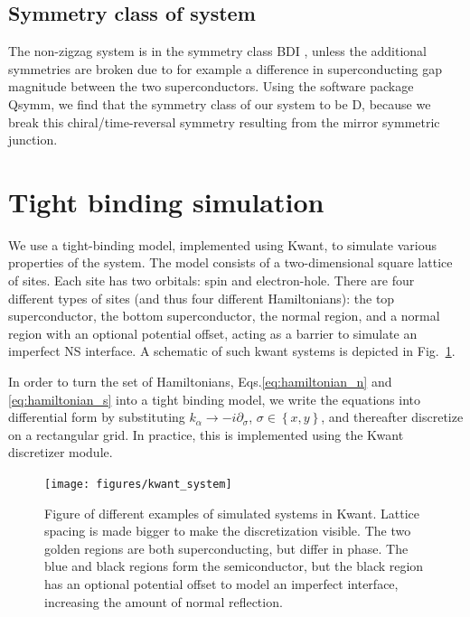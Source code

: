 \subsection{Symmetry class of system}
	The non-zigzag system is in the symmetry class BDI \cite{pientka_topological_2017}, unless the additional symmetries are broken due to for example a difference in superconducting gap magnitude between the two superconductors.
	Using the software package Qsymm\cite{varjas_qsymm_2018}, we find that the symmetry class of our system to be D, because we break this chiral/time-reversal symmetry resulting from the mirror symmetric junction.


\section{Tight binding simulation}

	We use a tight-binding model, implemented using Kwant, to simulate various properties of the system.
	The model consists of a two-dimensional square lattice of sites.
	Each site has two orbitals: spin and electron-hole.
	There are four different types of sites (and thus four different Hamiltonians): the top superconductor, the bottom superconductor, the normal region, and a normal region with an optional potential offset, acting as a barrier to simulate an imperfect NS interface.
	A schematic of such kwant systems is depicted in Fig.~\ref{fig:kwant_system}.

	In order to turn the set of Hamiltonians, Eqs.\eqref{eq:hamiltonian_n} and \eqref{eq:hamiltonian_s} into a tight binding model, we write the equations into differential form by substituting $k_\alpha \rightarrow - i \partial_\sigma$, $\sigma \in \left\{ x, y \right\}$, and thereafter discretize on a rectangular grid.
	In practice, this is implemented using the Kwant discretizer module.


	\begin{figure}[!htb]
	\centering
	\texttt{[image: figures/kwant\_system]}
	\caption{Figure of different examples of simulated systems in Kwant.
	Lattice spacing is made bigger to make the discretization visible.
	The two golden regions are both superconducting, but differ in phase.
	The blue and black regions form the semiconductor, but the black region has an optional potential offset to model an imperfect interface, increasing the amount of normal reflection.}
	\label{fig:kwant_system}
	\end{figure}


